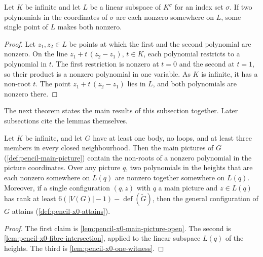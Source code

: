 \begin{lemma}
  \label{lem:pencil-x0-fibre-intersection}
  \leanok
  Let $K$ be infinite and let $L$ be a linear subspace of $K^\sigma$
  for an index set $\sigma$. If two polynomials in the coordinates of
  $\sigma$ are each nonzero somewhere on $L$, some single point of $L$
  makes both nonzero.
\end{lemma}
\begin{proof}
  \leanok
  Let $z_1, z_2 \in L$ be points at which the first and the second
  polynomial are nonzero. On the line $z_1 + t\,(z_2 - z_1)$, $t \in K$,
  each polynomial restricts to a polynomial in $t$. The first restriction
  is nonzero at $t = 0$ and the second at $t = 1$, so their product is a
  nonzero polynomial in one variable. As $K$ is infinite, it has a
  non-root $t$. The point $z_1 + t\,(z_2 - z_1)$ lies in $L$, and both
  polynomials are nonzero there.
\end{proof}

The next theorem states the main results of this subsection together.
Later subsections cite the lemmas themselves.

\begin{theorem}
  \label{thm:pencil-x0-main-component}
  \leanok
  Let $K$ be infinite, and let $G$ have at least one body, no loops, and
  at least three members in every closed neighbourhood. Then the main
  pictures of $G$ (\cref{def:pencil-main-picture}) contain the non-roots
  of a nonzero polynomial in the picture coordinates. Over any picture
  $q$, two polynomials in the heights that are each nonzero somewhere on
  $L(q)$ are nonzero together somewhere on $L(q)$. Moreover, if a single
  configuration $(q, z)$ with $q$ a main picture and $z \in L(q)$ has
  rank at least $6(|V(G)| - 1) - \operatorname{def}(\tilde G)$, then the
  general configuration of $G$ attains (\cref{def:pencil-x0-attains}).
\end{theorem}
\begin{proof}
  \leanok
  The first claim is \cref{lem:pencil-x0-main-picture-open}. The second
  is \cref{lem:pencil-x0-fibre-intersection}, applied to the linear
  subspace $L(q)$ of the heights. The third is
  \cref{lem:pencil-x0-one-witness}.
\end{proof}

